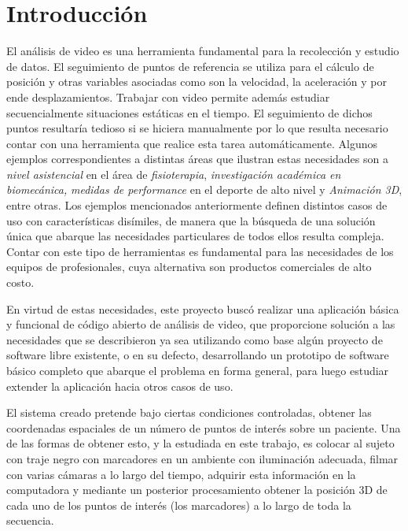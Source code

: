 \section{Introducción}
El análisis de video  es  una  herramienta  fundamental para la recolección y estudio de datos. El seguimiento de puntos de referencia se utiliza para el cálculo de posición y otras variables asociadas como son la velocidad, la aceleración y por ende desplazamientos. Trabajar con video permite además estudiar secuencialmente situaciones estáticas en el tiempo. El seguimiento de dichos puntos resultaría tedioso si se hiciera manualmente por lo que resulta necesario contar con una herramienta que realice esta tarea automáticamente.
Algunos ejemplos correspondientes a distintas áreas que ilustran estas necesidades son a \emph{nivel asistencial} en el área de \emph{fisioterapia}, \emph{investigación académica en biomecánica,} \emph{medidas de performance} en el deporte de alto nivel y \emph{Animación 3D}, entre otras. 
Los ejemplos mencionados anteriormente definen distintos casos de uso con características disímiles, de manera que la búsqueda de una solución única que abarque las necesidades particulares de todos ellos resulta compleja. Contar con este tipo de herramientas es fundamental para las necesidades de los equipos de profesionales, cuya alternativa son productos comerciales de alto costo.

En virtud de estas necesidades, este proyecto buscó realizar una aplicación básica y funcional de código abierto de análisis de video, que proporcione solución a las necesidades que se describieron ya sea utilizando como base algún  proyecto  de  software  libre  existente, o en su defecto, desarrollando un prototipo de software básico completo que abarque el problema en forma general, para luego estudiar extender la aplicación hacia otros casos de uso.

El sistema creado pretende bajo ciertas condiciones controladas, obtener las coordenadas espaciales de un número de puntos de interés sobre un paciente. Una de las formas de obtener esto, y la estudiada en este trabajo, es colocar al sujeto con traje negro con marcadores en un ambiente con iluminación adecuada, filmar con varias cámaras a lo largo del tiempo, adquirir esta información en la computadora y mediante un posterior procesamiento obtener la posición 3D de cada uno de los puntos de interés (los marcadores) a lo largo de toda la secuencia.
